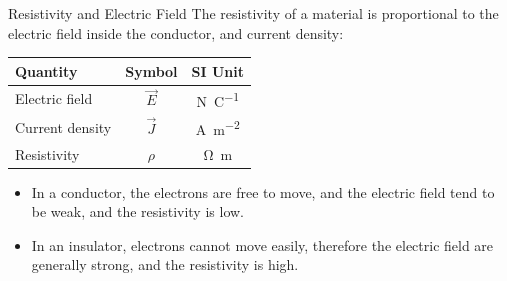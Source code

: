 \documentclass[12pt,aspectratio=169]{beamer}
\begin{document}
\begin{frame}{Resistivity and Electric Field}
  The resistivity of a material is proportional to the electric field inside
  the conductor, and current density:

  \begin{center}
    \begin{tabular}{l|c|c}
      \rowcolor{pink}
      \textbf{Quantity} & \textbf{Symbol} & \textbf{SI Unit} \\ \hline
      Electric field & $\vec E$ & \si{\newton\per\coulomb} \\
      Current density & $\vec J$ & \si{\ampere\per\metre\squared} \\
      Resistivity & $\rho$ & \si{\ohm\metre}
    \end{tabular}
  \end{center}
  \begin{itemize}
  \item In a conductor, the electrons are free to move, and the electric
    field tend to be weak, and the resistivity is low.
  \item In an insulator, electrons cannot move easily, therefore the electric
    field are generally strong, and the resistivity is high.
  \end{itemize}
\end{frame}
\end{document}
